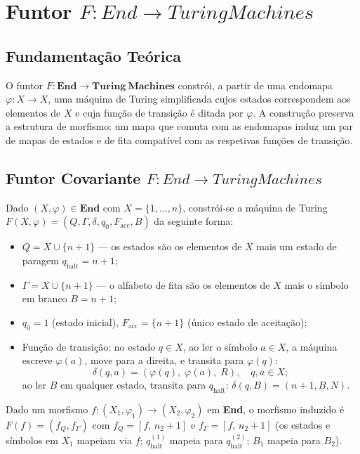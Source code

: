 \section{Funtor \texorpdfstring{$F: End \to Turing Machines$}{F: End -> Turing Machines}}
\label{sec:functor-end-turing}

\subsection{Fundamentação Teórica}

O funtor $F: \mathbf{End} \to \mathbf{Turing\ Machines}$ constrói, a partir de uma endomapa $\varphi: X \to X$, uma máquina de Turing simplificada cujos estados correspondem aos elementos de $X$ e cuja função de transição é ditada por $\varphi$. A construção preserva a estrutura de morfismo: um mapa que comuta com as endomapas induz um par de mapas de estados e de fita compatível com as respetivas funções de transição.

\subsection{Funtor Covariante \texorpdfstring{$F: End \to Turing Machines$}{F: End -> Turing Machines}}

\begin{definition}
Dado $(X, \varphi) \in \mathbf{End}$ com $X = \{1,\ldots,n\}$, constrói-se a máquina de Turing $F(X,\varphi) = (Q, \Gamma, \delta, q_0, F_{\mathrm{acc}}, B)$ da seguinte forma:
\begin{itemize}
    \item $Q = X \cup \{n{+}1\}$ --- os estados são os elementos de $X$ mais um estado de paragem $q_{\mathrm{halt}} = n{+}1$;
    \item $\Gamma = X \cup \{n{+}1\}$ --- o alfabeto de fita são os elementos de $X$ mais o símbolo em branco $B = n{+}1$;
    \item $q_0 = 1$ (estado inicial), $F_{\mathrm{acc}} = \{n{+}1\}$ (único estado de aceitação);
    \item Função de transição: no estado $q \in X$, ao ler o símbolo $a \in X$, a máquina escreve $\varphi(a)$, move para a direita, e transita para $\varphi(q)$:
    \[
        \delta(q, a) = (\varphi(q),\; \varphi(a),\; R), \quad q, a \in X;
    \]
    ao ler $B$ em qualquer estado, transita para $q_{\mathrm{halt}}$: $\delta(q, B) = (n{+}1, B, N)$.
\end{itemize}
Dado um morfismo $f: (X_1, \varphi_1) \to (X_2, \varphi_2)$ em \textbf{End}, o morfismo induzido é $F(f) = (f_Q, f_\Gamma)$ com $f_Q = [f,\, n_2{+}1]$ e $f_\Gamma = [f,\, n_2{+}1]$ (os estados e símbolos em $X_1$ mapeiam via $f$; $q_{\mathrm{halt}}^{(1)}$ mapeia para $q_{\mathrm{halt}}^{(2)}$; $B_1$ mapeia para $B_2$).
\end{definition}


